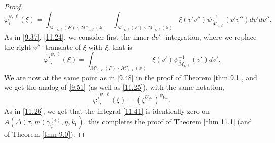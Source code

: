 \documentclass[12pts]{amsart}
\newcommand{\BA}{{\mathbb {A}}}
\begin{document}
\begin{proof}
 \begin{equation}\label{11.41}
 \tilde{\varphi}_{i}^{\psi,\ell}(\xi)=
 \int_{\mathcal{M}''_{i,\ell}(F)\backslash
 	\mathcal{M}''_{i,\ell}(\BA)}\int_{\mathcal{M}'_{i,\ell}(F)\backslash
 	\mathcal{M}'_{i,\ell}(\BA)}\xi(v'v'')\psi^{-1}_{\tilde{\mathcal{M}}_{i,\ell}}(v'v'')dv'dv''. 
 \end{equation}
 As in \eqref{9.37}, \eqref{11.24}, we consider first the inner $dv'$- integration, where we replace the right $v''$- translate of $\xi$ with $\xi$, that is
 \begin{equation}\label{11.42}
  \tilde{\varphi'}_{i}^{\psi,\ell}(\xi)=
 \int_{\mathcal{M}'_{i,\ell}(F)\backslash
 	\mathcal{M}'_{i,\ell}(\BA)}\xi(v')\psi^{-1}_{\tilde{\mathcal{M}}_{i,\ell}}(v')dv'. 
 \end{equation}
 We are now at the same point as in \eqref{9.48} in the proof of Theorem \ref{thm 9.1}, and we get the analog of \eqref{9.51} (as well as \eqref{11.25}), with the same notation,
 \begin{equation}\label{11.43}
 \tilde{\varphi'}_{i}^{\psi,\ell}(\xi)=(\xi^{U_{\ell^{2n}}})^{\psi_{V_{\ell^{2n}}}}.
\end{equation}
As in \eqref{11.26}, we get that the integral \eqref{11.41} is identically zero on\\
 $A(\Delta(\tau,m)\gamma_\psi^{(\epsilon)},\eta,k_0)$. this completes the proof of Theorem \ref{thm 11.1} (and of Theorem \ref{thm 9.0}).
 
\end{proof}
\end{document}
